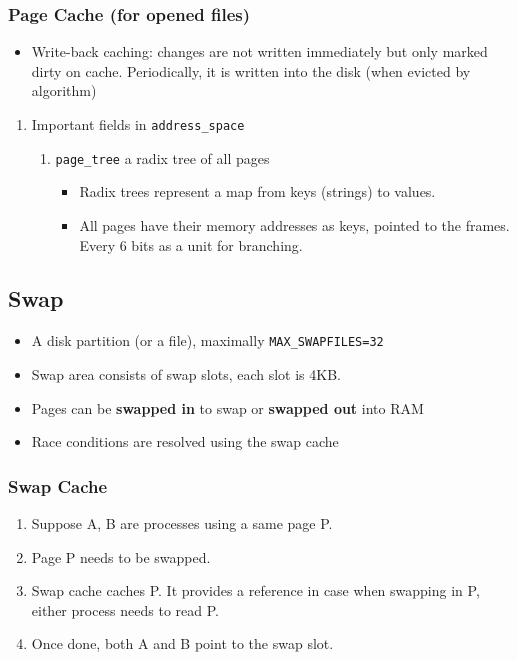 \documentclass[11pt]{article}
\begin{document}
\subsubsection{Page Cache (for opened files)}
\label{sec:org5098570}
\begin{itemize}
\item Write-back caching: changes are not written immediately but only marked dirty
on cache. Periodically, it is written into the disk (when evicted by algorithm)
\end{itemize}
\begin{enumerate}
\item Important fields in \texttt{address\_space}
\label{sec:org6bcdd45}
\begin{enumerate}
\item \texttt{page\_tree} a radix tree of all pages
\label{sec:org17d4ec8}
\begin{itemize}
\item Radix trees represent a map from keys (strings) to values.
\item All pages have their memory addresses as keys, pointed to the frames. Every 6
bits as a unit for branching.
\end{itemize}
\end{enumerate}
\end{enumerate}
\subsection{Swap}
\label{sec:org8eae2a0}
\begin{itemize}
\item A disk partition (or a file), maximally \texttt{MAX\_SWAPFILES=32}
\item Swap area consists of swap slots, each slot is 4KB.
\item Pages can be \textbf{swapped in} to swap or \textbf{swapped out} into RAM
\item Race conditions are resolved using the swap cache
\end{itemize}
\subsubsection{Swap Cache}
\label{sec:org2d243eb}
\begin{enumerate}
\item Suppose A, B are processes using a same page P.
\item Page P needs to be swapped.
\item Swap cache caches P. It provides a reference in case when swapping in P,
either process needs to read P.
\item Once done, both A and B point to the swap slot.
\end{enumerate}
\end{document}
